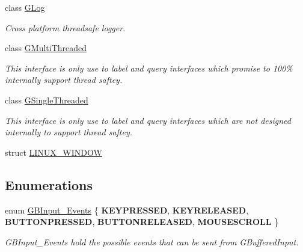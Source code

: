 \begin{DoxyCompactItemize}
class \hyperlink{class_g_w_1_1_c_o_r_e_1_1_g_log}{G\+Log}
\begin{DoxyCompactList}\small\item\em Cross platform threadsafe logger. \end{DoxyCompactList}\item 
class \hyperlink{class_g_w_1_1_c_o_r_e_1_1_g_multi_threaded}{G\+Multi\+Threaded}
\begin{DoxyCompactList}\small\item\em This interface is only use to label and query interfaces which promise to 100\% internally support thread saftey. \end{DoxyCompactList}\item 
class \hyperlink{class_g_w_1_1_c_o_r_e_1_1_g_single_threaded}{G\+Single\+Threaded}
\begin{DoxyCompactList}\small\item\em This interface is only use to label and query interfaces which are not designed internally to support thread saftey. \end{DoxyCompactList}\item 
struct \hyperlink{struct_g_w_1_1_c_o_r_e_1_1_l_i_n_u_x___w_i_n_d_o_w}{L\+I\+N\+U\+X\+\_\+\+W\+I\+N\+D\+OW}
\end{DoxyCompactItemize}
\subsection*{Enumerations}
\begin{DoxyCompactItemize}
\item 
\hypertarget{namespace_g_w_1_1_c_o_r_e_ad9b7ad6dcc306c2d2029ad1981f5dbe2}{}\label{namespace_g_w_1_1_c_o_r_e_ad9b7ad6dcc306c2d2029ad1981f5dbe2} 
enum \hyperlink{namespace_g_w_1_1_c_o_r_e_ad9b7ad6dcc306c2d2029ad1981f5dbe2}{G\+B\+Input\+\_\+\+Events} \{ \newline
{\bfseries K\+E\+Y\+P\+R\+E\+S\+S\+ED}, 
{\bfseries K\+E\+Y\+R\+E\+L\+E\+A\+S\+ED}, 
{\bfseries B\+U\+T\+T\+O\+N\+P\+R\+E\+S\+S\+ED}, 
{\bfseries B\+U\+T\+T\+O\+N\+R\+E\+L\+E\+A\+S\+ED}, 
\newline
{\bfseries M\+O\+U\+S\+E\+S\+C\+R\+O\+LL}
 \}\begin{DoxyCompactList}\small\item\em G\+B\+Input\+\_\+\+Events hold the possible events that can be sent from G\+Buffered\+Input. \end{DoxyCompactList}
\end{DoxyCompactItemize}
